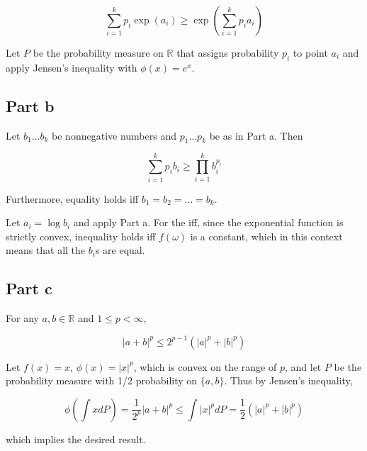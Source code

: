 \documentclass{article}
\newcommand{\R}{\mathbb{R}}
\begin{document}
\[
\sum_{i=1}^kp_i\exp(a_i) \geq \exp\left( \sum_{i=1}^kp_ia_i \right)
\]

Let $P$ be the probability measure on $\R$ that assigns probability $p_i$ to point $a_i$ and apply Jensen's inequality with $\phi(x) = e^x$.

\subsection*{Part b}

Let $b_1 \dots b_k$ be nonnegative numbers and $p_1 \dots p_k$ be as in Part a. Then

\[
\sum_{i=1}^k p_ib_i \geq \prod_{i=1}^k b_i^{p_i}
\]

Furthermore, equality holds iff $b_1 = b_2 = \dots = b_k$.

Let $a_i = \log b_i$ and apply Part a. For the iff, since the exponential function is strictly convex, inequality holds iff $f(\omega)$ is a constant, which in this context means that all the $b_i$s are equal.

\subsection*{Part c}

For any $a, b \in \R$ and $1 \leq p < \infty$,

\[
|a+b|^p \leq 2^{p-1}(|a|^p + |b|^p)
\]

Let $f(x) = x$, $\phi(x) = |x|^p$, which is convex on the range of $p$, and let $P$ be the probability measure with 1/2 probability on $\{a, b\}$. Thus by Jensen's inequality,

\[
\phi\left( \int xdP \right) = \frac{1}{2^p}|a+b|^p \leq \int |x|^pdP = \frac{1}{2}(|a|^p + |b|^p)
\]

which implies the desired result.
\end{document}
